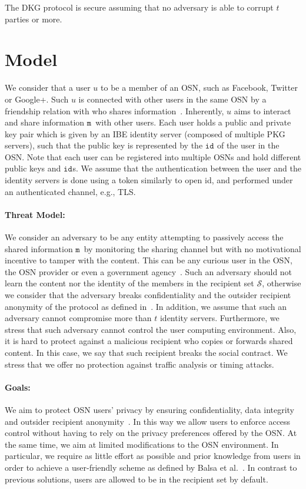 \documentclass[journal]{IEEEtran}
\newcommand{\msg}{\ensuremath{\mathtt{m}}}
\newcommand{\id}[1]{\ensuremath{\mathtt{id}_{#1}}}
\begin{document}
The DKG protocol is secure assuming that no adversary is able to corrupt $t$ parties or more. 


\section{Model}\label{sec:model}
We consider that a user $u$ to be a member of an OSN, such as Facebook, Twitter or Google+. Such $u$ is connected with other users in the same OSN by a friendship relation with who shares information~\cite{boyd2008social}. Inherently, $u$ aims to interact and share information \msg\ with other users. Each user holds a public and private key pair which is given by an IBE identity server (composed of multiple PKG servers), such that the public key is represented by the \id{} of the user in the OSN. Note that each user can be registered into multiple OSNs and hold different public keys and \id{}s. We assume that the authentication between the user and the identity servers is done using a token similarly to open id, and performed under an authenticated channel, e.g., TLS.


\paragraph{Threat Model:}
We consider an adversary to be any entity attempting to passively access the shared information \msg\ by monitoring the sharing channel but with no motivational incentive to tamper with the content. This can be any curious user in the OSN, the OSN provider or even a government agency~\cite{prism}. Such an adversary should not learn the content nor the identity of the members in the recipient set $\mathcal{S}$, otherwise we consider that the adversary breaks confidentiality and the outsider recipient anonymity of the protocol as defined in~\cite{FazioOutsiderANOBE}.
In addition, we assume that such an adversary cannot compromise more than $t$ identity servers.  Furthermore, we stress that such adversary cannot control the user computing environment. Also, it is hard to protect against a malicious recipient who copies or forwards shared content. In this case, we say that such recipient breaks the social contract. We stress that we offer no protection against traffic analysis or timing attacks. 


\paragraph{Goals:}
We aim to protect OSN users' privacy by ensuring confidentiality, data integrity and outsider recipient anonymity~\cite{FazioOutsiderANOBE}. In this way we allow users to enforce access control without having to rely on the privacy preferences offered by the OSN. At the same time, we aim at limited modifications to the OSN environment. In particular, we require as little  effort as possible and prior knowledge from users in order to achieve a user-friendly scheme as defined by Balsa et al.~\cite{article2400}. In contrast to previous solutions, users are allowed to be in the recipient set by default.
\end{document}
